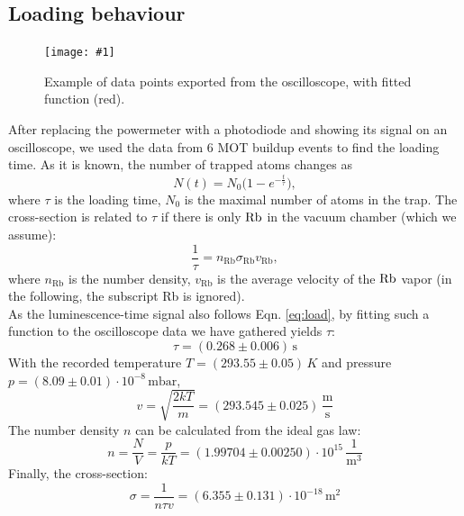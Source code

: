 \documentclass[twocolumn]{article}
\newcommand{\insertFigure}[1]{%
   \texttt{[image: \#1]}%
}
\begin{document}
\subsection{Loading behaviour}
\begin{figure}
\centering
\insertFigure{Images/mot_buildup.png}
\caption{Example of data points exported from the oscilloscope, with fitted function (red).}
\label{fig:buildup}
\end{figure}
After replacing the powermeter with a photodiode and showing its signal on an oscilloscope, we used the data from 6 MOT buildup events to find the loading time. As it is known,\cite{inexpensive} the number of trapped atoms changes as
\begin{equation}\label{eq:load}
N(t) = N_0 \big( 1 - e^{-\frac{t}{\tau}} \big),
\end{equation}
where $\tau$ is the loading time, $N_0$ is the maximal number of atoms in the trap. The cross-section is related to $\tau$ if there is only $\ce{Rb}$ in the vacuum chamber (which we assume):
\begin{equation}\label{eq:cross-section}
\frac{1}{\tau} = n_{\text{Rb}} \sigma_{\text{Rb}} v_{\text{Rb}},
\end{equation}
where $n_{\text{Rb}}$ is the number density, $v_{\text{Rb}}$ is the average velocity of the $\ce{Rb}$ vapor (in the following, the subscript Rb is ignored).\\
As the luminescence-time signal also follows Eqn. \ref{eq:load}, by fitting such a function to the oscilloscope data we have gathered yields $\tau$:
\begin{equation}
\tau = (0.268 \pm 0.006) \, \text{s}\nonumber
\end{equation}
With the recorded temperature $T = (293.55 \pm 0.05) \, K$ and pressure $p = (8.09 \pm 0.01)\cdot 10^{-8} \, \text{mbar}$,
\begin{equation}
v = \sqrt{\frac{2kT}{m}} = (293.545 \pm 0.025) \, \frac{\text{m}}{\text{s}} \nonumber
\end{equation}
The number density $n$ can be calculated from the ideal gas law:
\begin{equation}
n = \frac{N}{V} = \frac{p}{kT} = (1.99704 \pm 0.00250)\cdot 10^{15} \, \frac{1}{\text{m}^3}\nonumber
\end{equation}
Finally, the cross-section:
\begin{equation}
\sigma = \frac{1}{n \tau v} = (6.355 \pm 0.131) \cdot 10^{-18} \, \text{m}^2
\end{equation}
\end{document}
